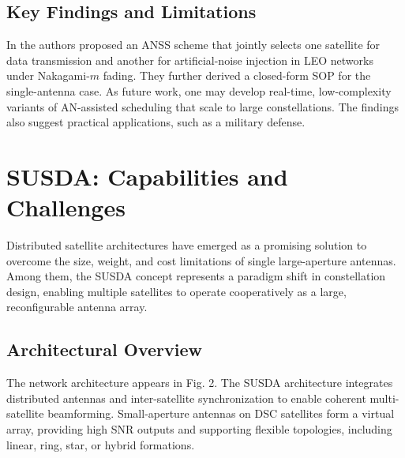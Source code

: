 \documentclass[conference]{IEEEtran}
\begin{document}
\subsection{Key Findings and Limitations} \label{sec3.4}

In\cite{YLee:25} the authors proposed an ANSS scheme that jointly selects one satellite for data transmission and another for artificial-noise injection in LEO networks under Nakagami-$m$ fading. They further derived a closed-form SOP for the single-antenna case. As future work, one may develop real-time, low-complexity variants of AN-assisted scheduling that scale to large constellations. The findings also suggest practical applications, such as a military defense.


\section{SUSDA: Capabilities and Challenges} \label{sec4}
Distributed satellite architectures have emerged as a promising solution to overcome the size, weight, and cost limitations of single large-aperture antennas. Among them, the SUSDA concept represents a paradigm shift in constellation design, enabling multiple satellites to operate cooperatively as a large, reconfigurable antenna array.

\subsection{Architectural Overview} \label{sec4.1}
The network architecture appears in Fig. 2. The SUSDA architecture integrates distributed antennas and inter-satellite synchronization to enable coherent multi-satellite beamforming. Small-aperture antennas on DSC satellites form a virtual array, providing high SNR outputs and supporting flexible topologies, including linear, ring, star, or hybrid formations.
\end{document}
